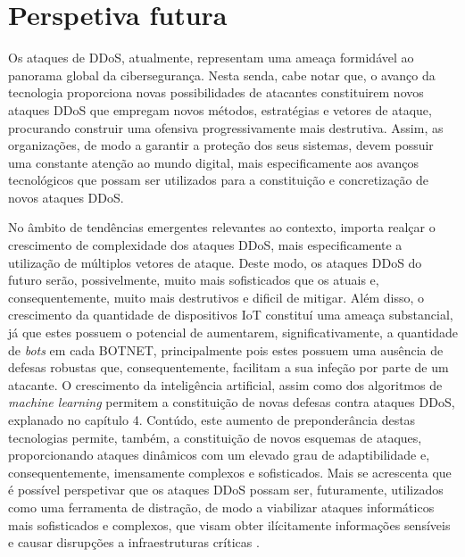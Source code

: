 \section{Perspetiva futura}
Os ataques de DDoS, atualmente, representam uma ameaça formidável ao panorama global da cibersegurança. Nesta senda, cabe notar que, o avanço da tecnologia proporciona novas possibilidades de atacantes constituirem novos ataques DDoS que empregam novos métodos, estratégias e vetores de ataque, procurando construir uma ofensiva progressivamente mais destrutiva. Assim, as organizações, de modo a garantir a proteção dos seus sistemas, devem possuir uma constante atenção ao mundo digital, mais especificamente aos avanços tecnológicos que possam ser utilizados para a constituição e concretização de novos ataques DDoS.


No âmbito de tendências emergentes relevantes ao contexto, importa realçar o crescimento de complexidade dos ataques DDoS, mais especificamente a utilização de múltiplos vetores de ataque. Deste modo, os ataques DDoS do futuro serão, possivelmente, muito mais sofisticados que os atuais e, consequentemente, muito mais destrutivos e dificil de mitigar. Além disso, o crescimento da quantidade de dispositivos IoT constituí uma ameaça substancial, já que estes possuem o potencial de aumentarem, significativamente, a quantidade de \textit{bots} em cada BOTNET, principalmente pois estes possuem uma ausência de defesas robustas que, consequentemente, facilitam a sua infeção por parte de um atacante. O crescimento da inteligência artificial, assim como dos algoritmos de \textit{machine learning} permitem a constituição de novas defesas contra ataques DDoS, explanado no capítulo 4. Contúdo, este aumento de preponderância destas tecnologias permite, também, a constituição de novos esquemas de ataques, proporcionando ataques dinâmicos com um elevado grau de adaptibilidade e, consequentemente, imensamente complexos e sofisticados. Mais se acrescenta que é possível perspetivar que os ataques DDoS possam ser, futuramente, utilizados como uma ferramenta de distração, de modo a viabilizar ataques informáticos mais sofisticados e complexos, que visam obter ilícitamente informações sensíveis e causar disrupções a infraestruturas críticas \cite{microminderscs_future_trends}.